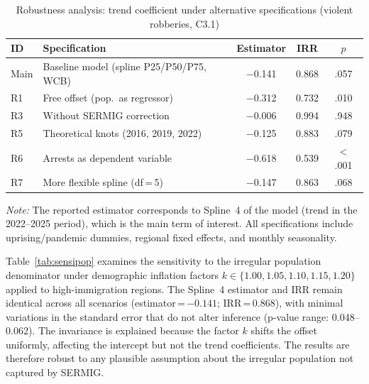 \documentclass[pdflatex,sn-basic]{sn-jnl}
\newcommand{\tablenote}[1]{%
  \vspace{2pt}\par
  {\footnotesize\textit{Note:} #1\par}
}
\begin{document}
\begin{table}[htbp]
\centering
\caption{Robustness analysis: trend coefficient under alternative specifications
(violent robberies, C3.1)}
\label{tab:robustez}
\small
\begin{tabular}{llccc}
\toprule
\textbf{ID} & \textbf{Specification} & \textbf{Estimator} & \textbf{IRR} & $p$ \\
\midrule
Main & Baseline model (spline P25/P50/P75, WCB) & $-$0.141 & 0.868 & .057 \\
\midrule
R1 & Free offset (pop.\ as regressor)      & $-$0.312 & 0.732 & .010 \\
R3 & Without SERMIG correction             & $-$0.006 & 0.994 & .948 \\
R5 & Theoretical knots (2016, 2019, 2022)  & $-$0.125 & 0.883 & .079 \\
R6 & Arrests as dependent variable         & $-$0.618 & 0.539 & $<$.001 \\
R7 & More flexible spline (df\,=\,5)       & $-$0.147 & 0.863 & .068 \\
\bottomrule
\end{tabular}
\tablenote{The reported estimator corresponds to Spline~4 of the model (trend in the
2022--2025 period), which is the main term of interest. All
specifications include uprising/pandemic dummies, regional fixed effects, and
monthly seasonality.}
\end{table}

Table~\ref{tab:sensipop} examines the sensitivity to the irregular population denominator
under demographic inflation factors $k \in \{1.00, 1.05, 1.10, 1.15, 1.20\}$ applied to high-immigration regions. The Spline~4 estimator and IRR
remain identical across all scenarios (estimator\,=\,$-0.141$; IRR\,=\,0.868),
with minimal variations in the standard error that do not alter inference (p-value
range: 0.048--0.062). The
invariance is explained because the factor $k$ shifts the offset uniformly, affecting
the intercept but not the trend coefficients. The results are therefore robust
to any plausible assumption about the irregular population not captured by SERMIG.
\end{document}
